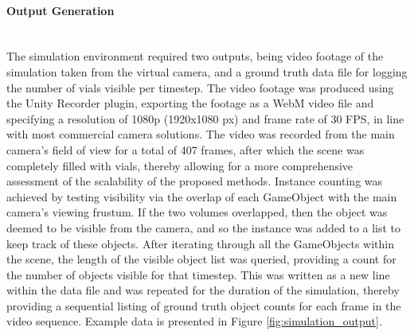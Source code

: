 \documentclass[10pt]{article}
\newcommand{\subsubsubsection}[1]{\paragraph{#1}\mbox{}\\}
\begin{document}
\clearpage
\subsubsubsection{Output Generation}
The simulation environment required two outputs, being video footage of the simulation taken from the virtual camera, and a ground truth data file for logging the number of vials visible per timestep. 
The video footage was produced using the Unity Recorder plugin, exporting the footage as a WebM video file and specifying a resolution of 1080p (1920x1080 px) and frame rate of 30 FPS, in line with most commercial camera solutions. The video was recorded from the main camera's field of view for a total of 407 frames, after which the scene was completely filled with vials, thereby allowing for a more comprehensive assessment of the scalability of the proposed methods. 
Instance counting was achieved by testing visibility via the overlap of each GameObject with the main camera's viewing frustum. If the two volumes overlapped, then the object was deemed to be visible from the camera, and so the instance was added to a list to keep track of these objects. After iterating through all the GameObjects within the scene, the length of the visible object list was queried, providing a count for the number of objects visible for that timestep. This was written as a new line within the data file and was repeated for the duration of the simulation, thereby providing a sequential listing of ground truth object counts for each frame in the video sequence. Example data is presented in Figure \ref{fig:simulation_output}.
\end{document}
